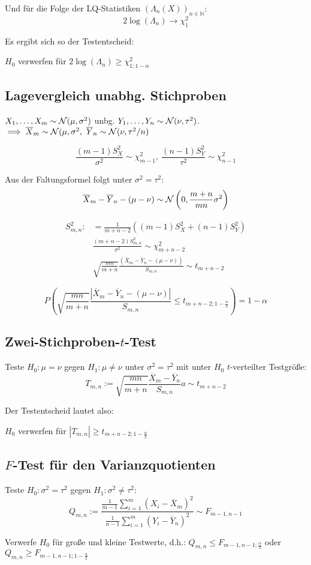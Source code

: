 Und für die Folge der LQ-Statistiken \((\Lambda_n(X))_{n \in \mathbb{N}}\):
\[ 2 \log(\Lambda_n) \to \chi_1^2 \]

Es ergibt sich so der Testentscheid:

\(H_0\) verwerfen für \(2 \log(\Lambda_n) \geq \chi_{1;1-\alpha}^2\)

\subsection*{Lagevergleich unabhg. Stichproben}

\(X_1,\dots,X_m \sim \mathcal{N}(\mu,\sigma^2)\) unbg. \(Y_1,\dots,Y_n \sim \mathcal{N}(\nu,\tau^2)\).
\(\implies \overline X_m \sim \mathcal{N}(\mu,\sigma^2, \ \overline Y_n \sim \mathcal{N}(\nu,\tau^2/n)\)

\[ \frac{(m-1)S_X^2}{\sigma^2} \sim \chi_{m-1}^2, \ \frac{(n-1)S_Y^2}{\tau^2} \sim \chi_{n-1}^2 \]

Aus der Faltungsformel folgt unter \(\sigma^2 = \tau^2\):
\[ \overline X_m - \overline Y_n - (\mu - \nu) \sim \mathcal{N}\left(0,\frac{m+n}{mn} \sigma^2\right) \]

\vspace*{-5mm}
\begin{align*}
S_{m,n}^2 :&= \frac{1}{m+n-2} \left((m-1)S_X^2 + (n-1)S_Y^2\right) \\
&\frac{(m+n-2)S_{m,n}^2}{\sigma^2} \sim \chi_{m+n-2}^2 \\
&\sqrt{\frac{mn}{m+n}}\frac{\left(\overline X_m - \overline Y_n - (\mu-\nu)\right)}{S_{m,n}} \sim t_{m+n-2}
\end{align*}

\[ P\left( \sqrt{\frac{mn}{m+n}} \frac{|\overline X_m - \overline Y_n - (\mu-\nu)|}{S_{m,n}} \leq t_{m+n-2;1-\frac{\alpha}{2}} \right) = 1-\alpha \]

\subsection*{Zwei-Stichproben-\(t\)-Test}

Teste \(H_0 : \mu = \nu\) gegen \(H_1 : \mu \neq \nu\) unter \(\sigma^2=\tau^2\) mit unter \(H_0\) \(t\)-verteilter Testgröße:
\[ T_{m,n} := \sqrt{\frac{mn}{m+n}} \frac{\overline X_m - \overline Y_n}{S_{m,n}}a \sim t_{m+n-2} \]

Der Testentscheid lautet also:

\(H_0\) verwerfen für \(|T_{m,n}| \geq t_{m+n-2;1-\frac{\alpha}{2}}\)

\subsection*{\(F\)-Test für den Varianzquotienten}

Teste \(H_0 : \sigma^2 = \tau^2\) gegen \(H_1 : \sigma^2 \neq \tau^2\):
\[ Q_{m,n} := \frac{\frac{1}{m-1}\sum_{i=1}^m(X_i-\overline X_m)^2}{\frac{1}{n-1}\sum_{i=1}^m(Y_i-\overline Y_n)^2} \sim F_{m-1,n-1} \]

Verwerfe \(H_0\) für große und kleine Testwerte, d.h.: \(Q_{m,n} \leq F_{m-1,n-1;\frac{\alpha}{2}}\) oder \(Q_{m,n} \geq F_{m-1,n-1;1-\frac{\alpha}{2}}\)

